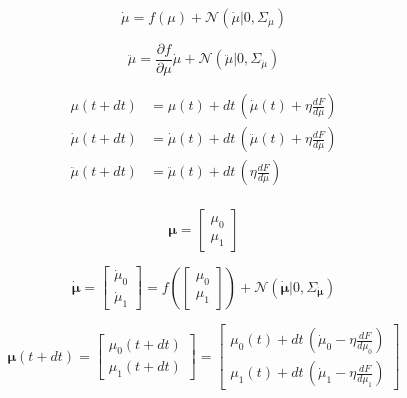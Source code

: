 \documentclass[a4paper, 10pt]{article}
\begin{document}
\begin{equation}
\dot{\mu} = f(\mu) + \mathcal{N}(\dot{\mu}|0,\Sigma_{\dot{\mu}})
\end{equation}

\begin{equation}
\ddot{\mu} = \frac{\partial f}{\partial \mu} \dot{\mu} + \mathcal{N}(\ddot{\mu}|0,\Sigma_{\ddot{\mu}})
\end{equation}

\begin{equation}
\begin{split}
\mu(t+dt) &= \mu(t) + dt \, (\dot{\mu}(t) + \eta \frac{dF}{d\mu} ) \\
\dot{\mu}(t+dt) &= \dot{\mu}(t) + dt \, 	(\ddot{\mu}(t) + \eta \frac{dF}{d \dot{\mu}}) \\
\ddot{\mu}(t+dt) &= \ddot{\mu}(t) + dt \, (\eta \frac{dF}{d \ddot{\mu}}) \\
\end{split}
\end{equation}

\begin{equation}
\bm \mu = \left[ \begin{matrix} \mu_0 \\ \mu_1 \end{matrix} \right]
\end{equation}

\begin{equation}
\dot{\bm \mu} = \left[ \begin{matrix} \dot{\mu}_0 \\ \dot{\mu}_1 \end{matrix} \right] =  f\left( \left[ \begin{matrix} \mu_0 \\ \mu_1 \end{matrix} \right] \right) + \mathcal{N}(\dot{\bm \mu}|0,\Sigma_{\dot{\bm \mu}})
\end{equation}

\begin{equation}
\bm \mu(t+dt) = \left[ \begin{matrix} \mu_0(t+dt) \\ \mu_1(t+dt) \end{matrix} \right] = 
	\left[ \begin{matrix} \mu_0(t) + dt \, (\dot{\mu}_0 - \eta \frac{dF}{d\mu_0}) \\
						  \mu_1(t) + dt \, (\dot{\mu}_1 - \eta \frac{dF}{d\mu_1})
	\end{matrix} \right]
\end{equation}
\end{document}
